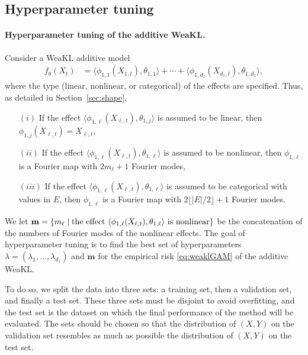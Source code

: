 \subsection{Hyperparameter tuning}
\label{sec:tuning}
\paragraph{Hyperparameter tuning of the additive WeaKL.} Consider a WeaKL additive model
\begin{align*}
    f_{\theta}(X_t) &=  \langle \phi_{1,1}(X_{1,t}), \theta_{1,1}\rangle + \cdots + \langle \phi_{1,d_1}(X_{d_1,t}), \theta_{1,d_1}\rangle,%
\end{align*}
where the type (linear, nonlinear, or categorical) of the effects are specified. Thus, as detailed in Section~\ref{sec:shape},
\begin{itemize}
    \item[$(i)$] If the effect $\langle \phi_{1,\ell}(X_{\ell,t}), \theta_{1,j}\rangle$ is assumed to be linear, then $\phi_{1,j}(X_{\ell,t}) = X_{\ell,t}$,
    \item[$(ii)$] If the effect $\langle \phi_{1,\ell}(X_{\ell,t}), \theta_{1,\ell}\rangle$ is assumed to be  nonlinear, then $\phi_{1,\ell}$ is a Fourier map with $2m_\ell +1$ Fourier modes,
    \item[$(iii)$] If the effect $\langle \phi_{1,\ell}(X_{\ell,t}), \theta_{1,\ell}\rangle$ is assumed to be categorical with values in $E$, then $\phi_{1,\ell}$ is a Fourier map with $2\lfloor |E|/2\rfloor+1$ Fourier modes.
\end{itemize}
We let $\mathbf{m} = \{m_\ell\mid \hbox{the effect $\langle \phi_{1,\ell}(X_{\ell,t}), \theta_{1,\ell}\rangle$ is nonlinear}\}$ be the concatenation of the numbers of Fourier modes of the nonlinear effects.
The goal of hyperparameter tuning is to find the best set of hyperparameters $\lambda = (\lambda_1, \hdots, \lambda_{d_1})$ and 
$\mathbf{m}$ for the empirical risk \eqref{eq:weaklGAM} of the additive WeaKL.

To do so, we split the data into three sets: a training set, then a validation set, and finally a test set.
These three sets must be disjoint to avoid overfitting, and the test set is the dataset on which the final performance of the method will be evaluated.
The sets should be chosen so that the distribution of $(X,Y)$ on the validation set resembles as much as possible the distribution of $(X,Y)$ on the test set.

